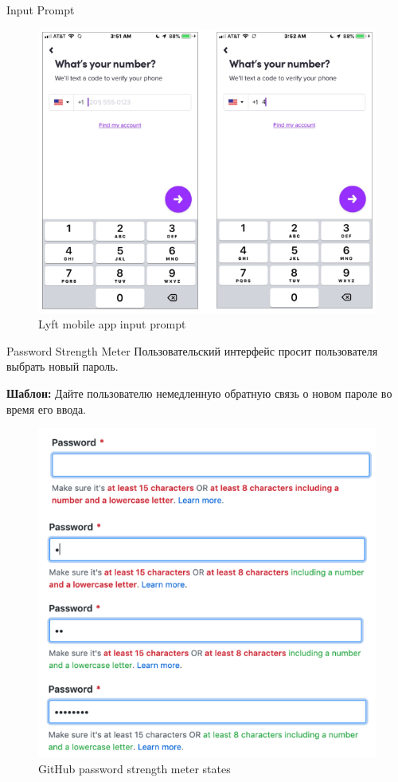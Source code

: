 \documentclass{beamer}
\begin{document}
\begin{frame}[t]{Input Prompt}
	\begin{figure}[h]
		\centering
		\includegraphics[scale=0.5]{images/lec08-pic47.png}
		\caption{Lyft mobile app input prompt}
	\end{figure}
\end{frame}

\begin{frame}[t]{Password Strength Meter}
	Пользовательский интерфейс просит пользователя выбрать новый пароль.
	
	\textbf{Шаблон:} Дайте пользователю немедленную обратную связь о новом пароле во время его ввода.
	\begin{figure}[h]
		\centering
		\includegraphics[scale=0.3]{images/lec08-pic48.png}
		\caption{GitHub password strength meter states}
	\end{figure}
\end{frame}
\end{document}
